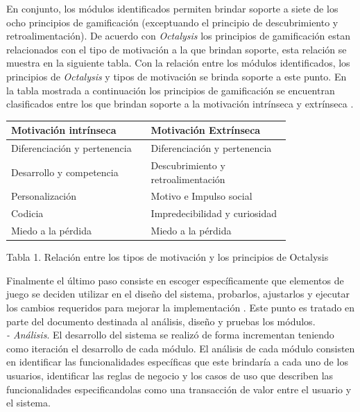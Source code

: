     En conjunto, los módulos identificados permiten brindar soporte a siete de los 
    ocho principios de gamificación (exceptuando el principio de descubrimiento y
    retroalimentación). De acuerdo con {\it Octalysis} \cite[p. 414]{Octalysis} los
    principios de gamificación estan relacionados con el tipo de motivación a la que
    brindan soporte, esta relación se muestra en la siguiente tabla. Con la relación
    entre los módulos identificados, los principios de {\it Octalysis} y tipos de
    motivación se brinda soporte a este punto. En la tabla mostrada a continuación
    los principios de gamificación se encuentran clasificados entre los que brindan
    soporte a la motivación intrínseca y extrínseca \cite[p. 28]{Octalysis}.\\

    \begin{center}
    \begin{tabular}{|p{0.4\linewidth}|p{0.4\linewidth}|} \hline
        {\bf Motivación intrínseca}  & {\bf Motivación Extrínseca} \\\hline
        Diferenciación y pertenencia & Diferenciación y pertenencia \\\hline
        Desarrollo y competencia     & Descubrimiento y retroalimentación \\\hline
        Personalización              & Motivo e Impulso social \\\hline
        Codicia                      & Impredecibilidad y curiosidad\\\hline
        Miedo a la pérdida           & Miedo a la pérdida\\\hline
    \end{tabular}\par\smallskip
    \small Tabla 1. Relación entre los tipos de motivación y los principios de
    Octalysis
    \end{center}

    \noindent
    Finalmente el último paso consiste en escoger específicamente que elementos
    de juego se deciden utilizar en el diseño del sistema, probarlos, ajustarlos y
    ejecutar los cambios requeridos para mejorar la implementación
    \cite[p. 69]{ForTheWin}. Este punto es tratado en parte del documento destinada
    al análisis, diseño y pruebas los módulos.\\

    {\it - Análisis}. El desarrollo del sistema se realizó de forma incrementan
    teniendo como iteración el desarrollo de cada módulo. El análisis de cada módulo
    consisten en identificar las funcionalidades específicas que este brindaría a cada
    uno de los usuarios, identificar las reglas de negocio y los casos de uso que
    describen las funcionalidades especificandolas como una transacción de valor
    entre el usuario y el sistema.\\

